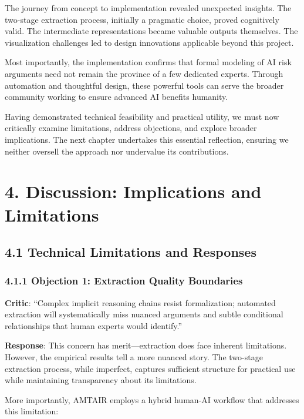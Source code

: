 \documentclass[
  11pt,
  letterpaper,
  openany]{book}
\begin{document}
The journey from concept to implementation revealed unexpected insights.
The two-stage extraction process, initially a pragmatic choice, proved
cognitively valid. The intermediate representations became valuable
outputs themselves. The visualization challenges led to design
innovations applicable beyond this project.

Most importantly, the implementation confirms that formal modeling of AI
risk arguments need not remain the province of a few dedicated experts.
Through automation and thoughtful design, these powerful tools can serve
the broader community working to ensure advanced AI benefits humanity.

Having demonstrated technical feasibility and practical utility, we must
now critically examine limitations, address objections, and explore
broader implications. The next chapter undertakes this essential
reflection, ensuring we neither oversell the approach nor undervalue its
contributions.


\chapter{4. Discussion: Implications and
Limitations}\label{sec-discussion}

\section{4.1 Technical Limitations and
Responses}\label{sec-technical-limitations}

\subsection{4.1.1 Objection 1: Extraction Quality
Boundaries}\label{sec-extraction-boundaries}

\textbf{Critic}: ``Complex implicit reasoning chains resist
formalization; automated extraction will systematically miss nuanced
arguments and subtle conditional relationships that human experts would
identify.''

\textbf{Response}: This concern has merit---extraction does face
inherent limitations. However, the empirical results tell a more nuanced
story. The two-stage extraction process, while imperfect, captures
sufficient structure for practical use while maintaining transparency
about its limitations.

More importantly, AMTAIR employs a hybrid human-AI workflow that
addresses this limitation:
\end{document}
